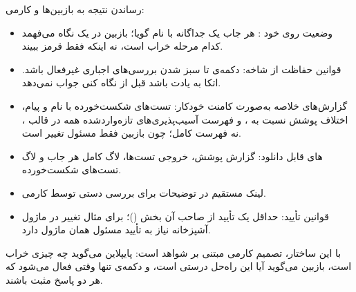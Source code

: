  رساندن نتیجه به بازبین‌ها و کارمی:
\begin{itemize}
	\item {وضعیت روی خود }: هر جاب یک  جداگانه با نام گویا؛ بازبین در یک نگاه می‌فهمد کدام مرحله خراب است، نه اینکه فقط قرمز ببیند.
	\item {قوانین حفاظت از شاخه}: دکمه‌ی  تا سبز شدن بررسی‌های اجباری غیرفعال باشد. اتکا به یادت باشد قبل از  نگاه کنی جواب نمی‌دهد.
	\item {گزارش‌های خلاصه به‌صورت کامنت خودکار}: تست‌های شکست‌خورده با نام و پیام، اختلاف پوشش نسبت به ، و فهرست آسیب‌پذیری‌های تازه‌واردشده همه در قالب ، نه فهرست کامل؛ چون بازبین فقط مسئول {تغییر} است.
	\item {های قابل دانلود}: گزارش پوشش، خروجی تست‌ها، لاگ کامل هر جاب و لاگ تست‌های  شکست‌خورده.
	\item {لینک } مستقیم در توضیحات  برای بررسی دستی توسط کارمی.
	\item {قوانین تأیید}: حداقل یک تأیید از صاحب آن بخش ()؛ برای مثال تغییر در ماژول آشپزخانه نیاز به تأیید مسئول همان ماژول دارد.
\end{itemize}

با این ساختار، تصمیم کارمی مبتنی بر شواهد است: پایپلاین می‌گوید چه چیزی خراب است، بازبین می‌گوید آیا این راه‌حل درستی است، و دکمه‌ی  تنها وقتی فعال می‌شود که هر دو پاسخ مثبت باشند.
